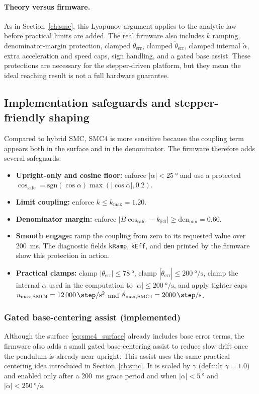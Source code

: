 \paragraph{Theory versus firmware.}
As in Section~\ref{ch:smc}, this Lyapunov argument applies to the analytic law before practical limits are added. The real firmware also includes $k$ ramping, denominator-margin protection, clamped $\theta_{\mathrm{err}}$, clamped $\dot{\theta}_{\mathrm{err}}$, clamped internal $\dot{\alpha}$, extra acceleration and speed caps, sign handling, and a gated base assist. These protections are necessary for the stepper-driven platform, but they mean the ideal reaching result is not a full hardware guarantee.

\subsection{Implementation safeguards and stepper-friendly shaping}
\label{sec:smc4_safeguards}
Compared to hybrid SMC, SMC4 is more sensitive because the coupling term appears both in the surface and in the denominator. The firmware therefore adds several safeguards:
\begin{itemize}
  \item \textbf{Upright-only and cosine floor:} enforce $|\alpha|<\SI{25}{\degree}$ and use a protected $\cos_{\mathrm{safe}}=\mathrm{sgn}(\cos\alpha)\max(|\cos\alpha|,0.2)$.
  \item \textbf{Limit coupling:} enforce $k\le k_{\max}=1.20$.
  \item \textbf{Denominator margin:} enforce $|B\cos_{\mathrm{safe}}-k_{\mathrm{Eff}}|\ge \mathrm{den}_{\min}=0.60$.
  \item \textbf{Smooth engage:} ramp the coupling from zero to its requested value over \SI{200}{ms}. The diagnostic fields \texttt{kRamp}, \texttt{kEff}, and \texttt{den} printed by the firmware show this protection in action.
  \item \textbf{Practical clamps:} clamp $|\theta_{\mathrm{err}}|\le \SI{78}{\degree}$, clamp $|\dot{\theta}_{\mathrm{err}}|\le \SI{200}{\degree\per\second}$, clamp the internal $\dot{\alpha}$ used in the computation to $|\dot{\alpha}|\le \SI{200}{\degree\per\second}$, and apply tighter caps $u_{\max,\mathrm{SMC4}}=\SI{12000}{\step\per\second\squared}$ and $\dot{\theta}_{\max,\mathrm{SMC4}}=\SI{2000}{\step\per\second}$.
\end{itemize}

\subsubsection{Gated base-centering assist (implemented)}
Although the surface \eqref{eq:smc4_surface} already includes base error terms, the firmware also adds a small gated base-centering assist to reduce slow drift once the pendulum is already near upright. This assist uses the same practical centering idea introduced in Section~\ref{ch:smc}. It is scaled by $\gamma$ (default $\gamma=1.0$) and enabled only after a \SI{200}{ms} grace period and when $|\alpha|<\SI{5}{\degree}$ and $|\dot{\alpha}|<\SI{250}{\degree\per\second}$.

